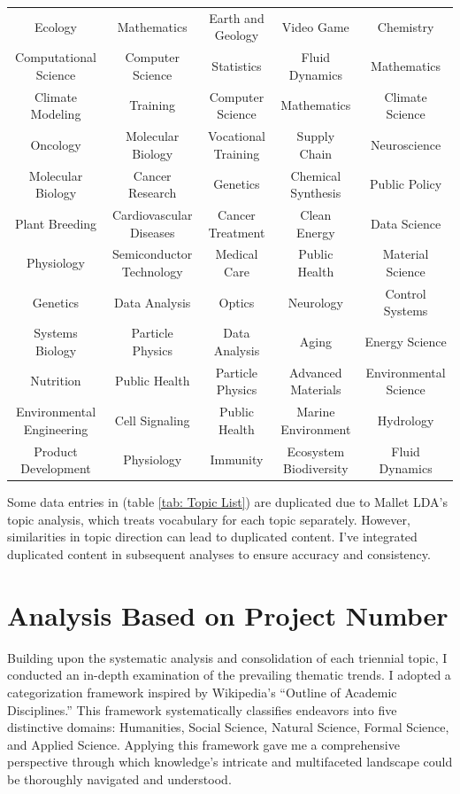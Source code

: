 \begin{table}[H]
\begin{adjustbox}{width=\textwidth}
\begin{tabular}{ *{5}{c} }
Ecology	&	Mathematics	&	Earth and Geology	&	Video Game	&	Chemistry	\\
Computational Science	&	Computer Science	&	Statistics	&	Fluid Dynamics	&	Mathematics	\\
Climate Modeling	&	Training	&	Computer Science	&	Mathematics	&	Climate Science	\\
Oncology	&	Molecular Biology	&	Vocational Training	&	Supply Chain	&	Neuroscience	\\
Molecular Biology	&	Cancer Research	&	Genetics	&	Chemical Synthesis	&	Public Policy	\\
Plant Breeding	&	Cardiovascular Diseases	&	Cancer Treatment	&	Clean Energy	&	Data Science	\\
Physiology	&	Semiconductor Technology	&	Medical Care	&	Public Health	&	Material Science	\\
Genetics	&	Data Analysis	&	Optics	&	Neurology	&	Control Systems	\\
Systems Biology	&	Particle Physics	&	Data Analysis	&	Aging	&	Energy Science	\\
Nutrition	&	Public Health	&	Particle Physics	&	Advanced Materials	&	Environmental Science	\\
Environmental Engineering	&	Cell Signaling	&	Public Health	&	Marine Environment	&	Hydrology	\\
Product Development	&	Physiology	&	Immunity	&	Ecosystem Biodiversity	&	Fluid Dynamics	\\
            \bottomrule
        \end{tabular}
    \end{adjustbox}

\end{table}
Some data entries in (table \ref{tab: Topic List}) are duplicated due to Mallet LDA's topic analysis, which treats vocabulary for each topic separately. However, similarities in topic direction can lead to duplicated content. I've integrated duplicated content in subsequent analyses to ensure accuracy and consistency.




\section*{Analysis Based on Project Number}
Building upon the systematic analysis and consolidation of each triennial topic, I conducted an in-depth examination of the prevailing thematic trends. I adopted a categorization framework inspired by Wikipedia's ``Outline of Academic Disciplines.'' This framework systematically classifies endeavors into five distinctive domains: Humanities, Social Science, Natural Science, Formal Science, and Applied Science. Applying this framework gave me a comprehensive perspective through which knowledge's intricate and multifaceted landscape could be thoroughly navigated and understood. 


